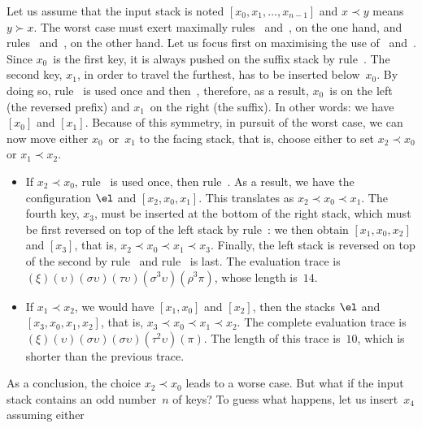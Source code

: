 Let us assume that
the input stack is noted \([x_0, x_1, \dots, x_{n-1}]\) and \(x \prec
y\) means \(y \succ x\). The worst case must exert maximally rules
\clause{\sigma}~and~\clause{\tau}, on the one hand, and rules
\clause{\pi}~and~\clause{\rho}, on the other hand. Let us focus first
on maximising the use of \clause{\sigma}~and~\clause{\tau}. Since
\(x_0\)~is the first key, it is always pushed on the suffix stack by
rule~\clause{\upsilon}. The second key, \(x_1\), in order to travel
the furthest, has to be inserted below~\(x_0\). By doing so,
rule~\clause{\sigma} is used once and then~\clause{\upsilon},
therefore, as a result, \(x_0\)~is on the left (the reversed prefix)
and \(x_1\)~on the right (the suffix). In other words: we have
\([x_0]\) and \([x_1]\). Because of this symmetry, in pursuit of the
worst case, we can now move either \(x_0\)~or~\(x_1\) to the facing
stack, that is, choose either to set \(x_2 \prec x_0\) or \(x_1 \prec
x_2\).
\begin{itemize}

\item If \(x_2 \prec x_0\), rule~\clause{\tau} is used once, then
  rule~\clause{\upsilon}. As a result, we have the configuration
  \(\el\) and \([x_2, x_0, x_1]\). This translates as \(x_2 \prec x_0
  \prec x_1\). The fourth key, \(x_3\), must be inserted at the bottom
  of the right stack, which must be first reversed on top of the left
  stack by rule~\clause{\sigma}: we then obtain \([x_1, x_0, x_2]\)
  and \([x_3]\), that is, \(x_2 \prec x_0 \prec x_1 \prec
  x_3\). Finally, the left stack is reversed on top of the second by
  rule~\clause{\rho} and rule~\clause{\pi} is last. The evaluation
  trace is
  \((\xi)(\upsilon)(\sigma\upsilon)(\tau\upsilon)(\sigma^3\upsilon)
  (\rho^3\pi)\), whose length is~\(14\).

\item If \(x_1 \prec x_2\), we would have \([x_1, x_0]\) and
  \([x_2]\), then the stacks \(\el\) and \([x_3, x_0, x_1, x_2]\),
  that is, \(x_3 \prec x_0 \prec x_1 \prec x_2\). The complete
  evaluation trace is
  \((\xi)(\upsilon)(\sigma\upsilon)(\sigma\upsilon)(\tau^2\upsilon)
  (\pi)\). The length of this trace is~\(10\), which is shorter than
  the previous trace.

\end{itemize}
As a conclusion, the choice \(x_2 \prec x_0\) leads to a worse
case. But what if the input stack contains an odd number~\(n\) of
keys? To guess what happens, let us insert~\(x_4\) assuming either
